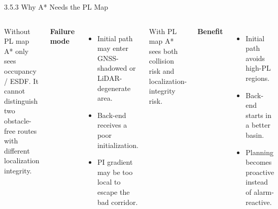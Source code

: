 \documentclass[10pt,aspectratio=169,xcolor=dvipsnames]{beamer}
\begin{document}
\begin{frame}{3.5.3 Why A* Needs the PL Map}
  \small
  \begin{columns}[T]
    \begin{alertblock}{Without PL map}
      \footnotesize A* only sees occupancy / ESDF. It cannot distinguish two obstacle-free routes with different localization integrity.
    \end{alertblock}

    \textbf{Failure mode}
    \begin{itemize}\footnotesize
      \item Initial path may enter GNSS-shadowed or LiDAR-degenerate area.
      \item Back-end receives a poor initialization.
      \item PI gradient may be too local to escape the bad corridor.
    \end{itemize}

    \begin{exampleblock}{With PL map}
      \footnotesize A* sees both collision risk and localization-integrity risk.
    \end{exampleblock}

    \textbf{Benefit}
    \begin{itemize}\footnotesize
      \item Initial path avoids high-PL regions.
      \item Back-end starts in a better basin.
      \item Planning becomes proactive instead of alarm-reactive.
    \end{itemize}
  \end{columns}
\end{frame}
\end{document}
